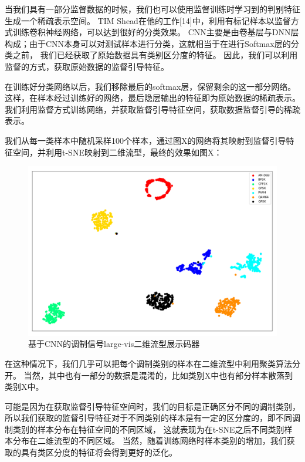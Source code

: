 当我们具有一部分监督数据的时候，我们也可以使用监督训练时学习到的判别特征生成一个稀疏表示空间。
TIM Shead在他的工作[14]中，利用有标记样本以监督方式训练卷积神经网络，可以达到很好的分类效果。
CNN主要是由卷基层与DNN层构成；由于CNN本身可以对测试样本进行分类，这就相当于在进行Softmax层的分类之前，
我们已经获取了原始数据具有类别区分度的特征。
因此，我们可以利用监督的方式，获取原始数据的监督引导特征。\par

在训练好分类网络以后，我们移除最后的softmax层，保留剩余的这一部分网络。
这样，在样本经过训练好的网络，最后隐层输出的特征即为原始数据的稀疏表示。
我们利用监督方式训练网络，并获取监督引导特征空间，获取数据监督引导的稀疏表示。\par
我们从每一类样本中随机采样100个样本，通过图X的网络将其映射到监督引导特征空间，并利用t-SNE映射到二维流型，最终的效果如图X：
\begin{figure}[!h]
	\centering
	\includegraphics[scale=0.4]{figures/chapter_3/fig_3_7}
	\caption{基于CNN的调制信号large-vis二维流型展示码器}	\label{sec:fig_3_7}
\end{figure}

在这种情况下，我们几乎可以把每个调制类别的样本在二维流型中利用聚类算法分开。
当然，其中也有一部分的数据是混淆的，比如类别X中也有部分样本散落到类别X中。\par
可能是因为在获取监督引导特征空间时，我们的目标是正确区分不同的调制类别，
所以我们获取的监督引导特征对于不同类别的样本是有一定的区分度的，即不同调制类别的样本分布在特征空间的不同区域，
这就表现为在t-SNE之后不同类别样本分布在二维流型的不同区域。
当然，随着训练网络时样本类别的增加，我们获取的具有类区分度的特征将会得到更好的泛化。\par



